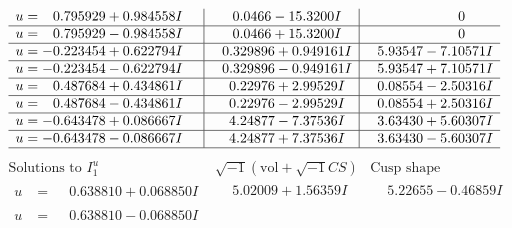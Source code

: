 \documentclass[1p]{elsarticle_modified}
\theoremstyle{definition}
\newcommand{\I}{\sqrt{-1}}
\begin{document}
$$\begin{array}{c|c|c}
\begin{aligned}
u &= \phantom{-}0.795929 + 0.984558 I\end{aligned}
 & \phantom{-}0.0466 - 15.3200 I & \phantom{-0.000000 } 0 \\ \hline\begin{aligned}
u &= \phantom{-}0.795929 - 0.984558 I\end{aligned}
 & \phantom{-}0.0466 + 15.3200 I & \phantom{-0.000000 } 0 \\ \hline\begin{aligned}
u &= -0.223454 + 0.622794 I\end{aligned}
 & \phantom{-}0.329896 + 0.949161 I & \phantom{-}5.93547 - 7.10571 I \\ \hline\begin{aligned}
u &= -0.223454 - 0.622794 I\end{aligned}
 & \phantom{-}0.329896 - 0.949161 I & \phantom{-}5.93547 + 7.10571 I \\ \hline\begin{aligned}
u &= \phantom{-}0.487684 + 0.434861 I\end{aligned}
 & \phantom{-}0.22976 + 2.99529 I & \phantom{-}0.08554 - 2.50316 I \\ \hline\begin{aligned}
u &= \phantom{-}0.487684 - 0.434861 I\end{aligned}
 & \phantom{-}0.22976 - 2.99529 I & \phantom{-}0.08554 + 2.50316 I \\ \hline\begin{aligned}
u &= -0.643478 + 0.086667 I\end{aligned}
 & \phantom{-}4.24877 - 7.37536 I & \phantom{-}3.63430 + 5.60307 I \\ \hline\begin{aligned}
u &= -0.643478 - 0.086667 I\end{aligned}
 & \phantom{-}4.24877 + 7.37536 I & \phantom{-}3.63430 - 5.60307 I\\
 \hline 
 \end{array}$$\newpage$$\begin{array}{c|c|c}  
\text{Solutions to }I^u_{1}& \I (\text{vol} + \sqrt{-1}CS) & \text{Cusp shape}\\
 \hline 
\begin{aligned}
u &= \phantom{-}0.638810 + 0.068850 I\end{aligned}
 & \phantom{-}5.02009 + 1.56359 I & \phantom{-}5.22655 - 0.46859 I \\ \hline\begin{aligned}
u &= \phantom{-}0.638810 - 0.068850 I\end{aligned}

\end{array}$$
\end{document}
